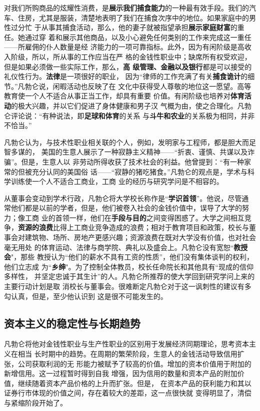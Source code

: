 对我们所购商品的炫耀性消费，是\textbf{展示我们捕食能力}的一种最有效手段。我们的汽
车、住房，尤其是服装，清楚地表明了我们在捕食次序中的地位。如果家庭中的男性过分忙
于从事其捕食活动，那么，他的妻子就被指望承担\textbf{展示家庭财富}的重任。她通过穿
着和展示其他商品，以及小心避免任何类别的工作来完成这一重任——所雇佣的仆人数量是经
济能力的一项可靠指标。此外，因为有闲阶级是高收入阶级，所以，所从事的工作应当在严
格的金钱性职业中；缺席所有权受欢迎，但是如果必须做一些实际工作，那么，\textbf{高
  级管理、金融以及银行}都是可以接受的礼仪性行为。\textbf{法律}是一项很好的职业，
因为“律师的工作充满了有关\textbf{捕食诡计}的细节。”凡勃仑说，闲暇活动也反映了在
文化中获得受人尊敬的地位这一愿望。高等教育使一个人不适合从事正当工作，却具有重要
价值。有闲阶级也培养对\textbf{体育活动}的极大兴趣，并以它们促进了身体健康和男子汉
气概为由，使之合理化。凡勃仑评论说：“有种说法，即\textbf{足球和体育}的关系
与\textbf{斗牛和农业}的关系极为相同，并非不恰当。”

凡勃仑认为，与技术性职业相关联的个人，例如，发明家与工程师，都是胆大而足智多谋的，
美国的生意人展示了一种寂静主义精神——“折衷、谨慎、共谋以及诈骗”。但是，生意人以
非劳动所得收获了技术社会的利益。他曾提到：“有一种家常的但被充分认同的美国俗
话——“寂静的猪吃猪食。”凡勃仑的观点是，学术与科学训练使一个人不适合工商业，工商
业的经历与研究学问是不相容的。

从董事会变动到学术行政，凡勃仑将大学校长称作是“\textbf{学识首领}”。他说，尽管通
常他们都是以前的学者，但是，他们被卷入社会的金钱价值中，误导了大学的努力；像工商
业的首领一样，他们在\textbf{手段与目的}之间变得困惑了。大学之间相互竞
争，\textbf{资源的浪费}比得上工商业竞争造成的浪费；相对于教育项目和政策，校长与董
事会对建筑物、场所、房地产更感兴趣；资源浪费在既对大学没有价值，也对社会毫无用处
的体育运动、法律与商学院、典礼以及盛会上。凡勃仑没有宽恕“\textbf{教授会}"，那些
教授认为“他们的薪水不具有工资的性质”，他们没有集体谈判的权利，他们立志成
为“\textbf{乡绅}"。为了控制全体教员，校长任命院长和其他具有“现成的信仰多样性，
并坚定忠诚于其生计”的人。凡勃仑所推荐的使大学回到研究学问上来的主要行动计划是取
消校长与董事会。很难断定凡勃仑对于这一讽刺性的建议有多勾认真，但是，至少他认识到
这是很不可能发生的。

\clearpage

\subsection{资本主义的稳定性与长期趋势}

凡勃仑将他对金钱性职业与生产性职业的区别用于发展经济同期理论，思考资本主义在相当
长时期中的趋势。在周期的繁荣阶段，生意人的金钱活动导致信用扩张，公司获取利润的无
形能力被赋予了较高的价值。增加的资本价值用于附加的新增信用。这一过程暂时得到自我
增强，因为信用的数量和资本产品的附加价值，继续随着资本产品价格的上升而扩张。但是，
在资本产品的获利能力和其以证券行市体现的价值之间，存在着较大的差距，这一点很快就
变得明显了，清偿与紧缩阶段开始了。

